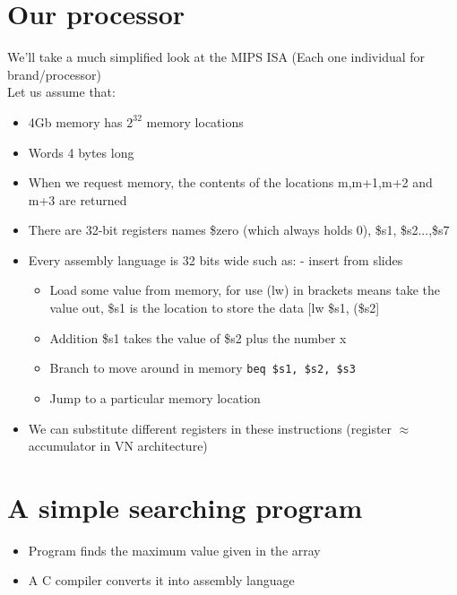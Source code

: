 \documentclass{article}[18pt]
\begin{document}
\section{Our processor}
We'll take a much simplified look at the MIPS ISA (Each one individual for brand/processor)\\
Let us assume that:
\begin{itemize}
\item 4Gb memory has $2^{32}$ memory locations
\item Words 4 bytes long
\item When we request memory, the contents of the locations m,m+1,m+2 and m+3 are returned
\item There are 32-bit registers names \$zero (which always holds 0), \$s1, \$s2...,\$s7
\item Every assembly language is 32 bits wide such as: - insert from slides
\begin{itemize}
\item Load some value from memory, for use (lw) in brackets means take the value out, \$s1 is the location to store the data [lw \$s1, (\$s2]
\item Addition \$s1 takes the value of \$s2 plus the number x
\item Branch to move around in memory \texttt{beq \$s1, \$s2, \$s3}
\item Jump to a particular memory location
\end{itemize}
\item We can substitute different registers in these instructions (register $\approx$ accumulator in VN architecture)
\end{itemize}
\section{A simple searching program}
\begin{itemize}
\item Program finds the maximum value given in the array
\item A C compiler converts it into assembly language
\end{itemize}
\end{document}
